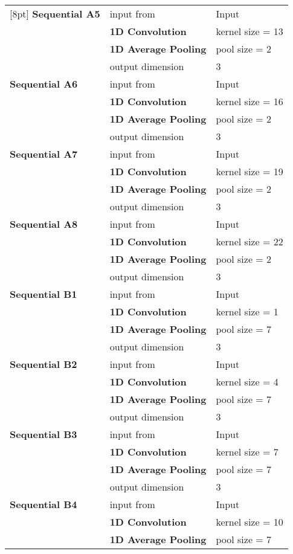 \begin{appendices}
\begin{tabularx}{\textwidth}[!h]{X X X}
	[8pt]
	\textbf{Sequential A5} & input from & Input\\
	& \textbf{1D Convolution} & kernel size = 13\\
	& \textbf{1D Average Pooling} & pool size = 2\\
	& output dimension & 3\\
	[8pt]
	\textbf{Sequential A6} & input from & Input\\
	& \textbf{1D Convolution} & kernel size = 16\\
	& \textbf{1D Average Pooling} & pool size = 2\\
	& output dimension & 3\\
	[8pt]
	\textbf{Sequential A7} & input from & Input\\
	& \textbf{1D Convolution} & kernel size = 19\\
	& \textbf{1D Average Pooling} & pool size = 2\\
	& output dimension & 3\\
	[8pt]
	\textbf{Sequential A8} & input from & Input\\
	& \textbf{1D Convolution} & kernel size = 22\\
	& \textbf{1D Average Pooling} & pool size = 2\\
	& output dimension & 3\\
	[8pt]
	\textbf{Sequential B1} & input from & Input\\
	& \textbf{1D Convolution} & kernel size = 1\\
	& \textbf{1D Average Pooling} & pool size = 7\\
	& output dimension & 3\\
	[8pt]
	\textbf{Sequential B2} & input from & Input\\
	& \textbf{1D Convolution} & kernel size = 4\\
	& \textbf{1D Average Pooling} & pool size = 7\\
	& output dimension & 3\\
	[8pt]
	\textbf{Sequential B3} & input from & Input\\
	& \textbf{1D Convolution} & kernel size = 7\\
	& \textbf{1D Average Pooling} & pool size = 7\\
	& output dimension & 3\\
	[8pt]
	\textbf{Sequential B4} & input from & Input\\
	& \textbf{1D Convolution} & kernel size = 10\\
	& \textbf{1D Average Pooling} & pool size = 7\\

\end{tabularx}
\end{appendices}
